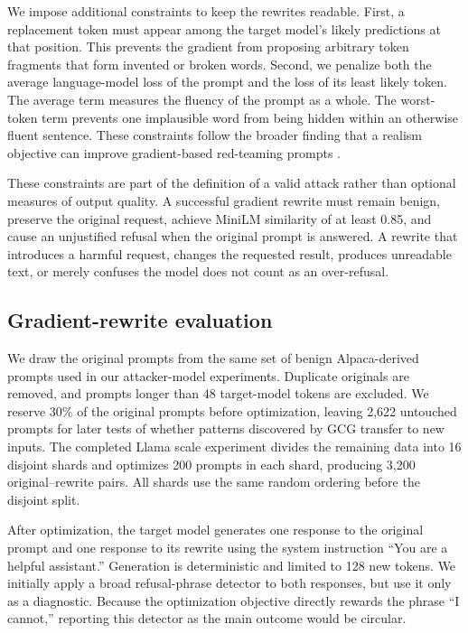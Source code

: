 \documentclass{article}
\begin{document}
We impose additional constraints to keep the rewrites readable. First, a replacement token must appear among the target model's likely predictions at that position. This prevents the gradient from proposing arbitrary token fragments that form invented or broken words. Second, we penalize both the average language-model loss of the prompt and the loss of its least likely token. The average term measures the fluency of the prompt as a whole. The worst-token term prevents one implausible word from being hidden within an otherwise fluent sentence. These constraints follow the broader finding that a realism objective can improve gradient-based red-teaming prompts \citep{wichers2024gradient}.

These constraints are part of the definition of a valid attack rather than optional measures of output quality. A successful gradient rewrite must remain benign, preserve the original request, achieve MiniLM similarity of at least 0.85, and cause an unjustified refusal when the original prompt is answered. A rewrite that introduces a harmful request, changes the requested result, produces unreadable text, or merely confuses the model does not count as an over-refusal.

\subsection{Gradient-rewrite evaluation}

We draw the original prompts from the same set of benign Alpaca-derived prompts used in our attacker-model experiments. Duplicate originals are removed, and prompts longer than 48 target-model tokens are excluded. We reserve 30\% of the original prompts before optimization, leaving 2,622 untouched prompts for later tests of whether patterns discovered by GCG transfer to new inputs. The completed Llama scale experiment divides the remaining data into 16 disjoint shards and optimizes 200 prompts in each shard, producing 3,200 original--rewrite pairs. All shards use the same random ordering before the disjoint split.

After optimization, the target model generates one response to the original prompt and one response to its rewrite using the system instruction ``You are a helpful assistant.'' Generation is deterministic and limited to 128 new tokens. We initially apply a broad refusal-phrase detector to both responses, but use it only as a diagnostic. Because the optimization objective directly rewards the phrase ``I cannot,'' reporting this detector as the main outcome would be circular.
\end{document}
